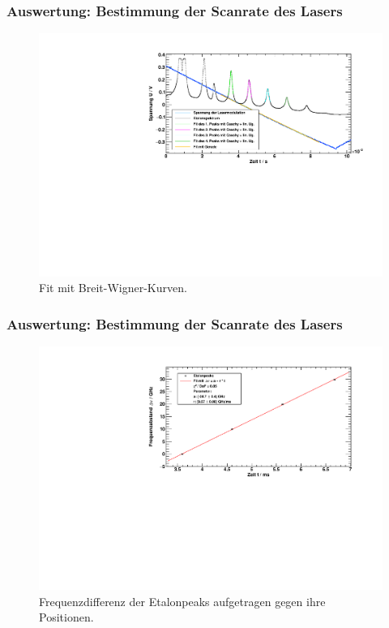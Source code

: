 \begin{frame}
\frametitle{Auswertung: Bestimmung der Scanrate des Lasers}
\begin{figure}
    \centering
    \includegraphics[width=\textwidth]{../img/down-etalon_zoom_fit.pdf}
    \caption{Fit mit Breit-Wigner-Kurven.}
\end{figure}
\end{frame}

\begin{frame}
\frametitle{Auswertung: Bestimmung der Scanrate des Lasers}
  \begin{figure}[H]
      \centering
      \includegraphics[width=\textwidth]{../img/down-etalon_zoom-etalon_calibration.pdf}
      \caption{Frequenzdifferenz der Etalonpeaks aufgetragen gegen ihre Positionen.}
  \end{figure}
\end{frame}

